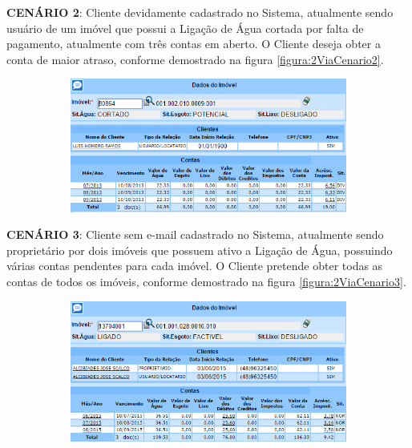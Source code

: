 \begin{flushleft}
	\begin{description}
		\item \textbf{CENÁRIO 2}: Cliente devidamente cadastrado no Sistema, atualmente sendo usuário de um imóvel que possui a Ligação de Água cortada por falta de pagamento, atualmente com três contas em aberto. O Cliente deseja obter a conta de maior atraso, conforme demostrado na figura \ref{figura:2ViaCenario2}.
		\begin{figure}[H]
			\centering
			\caption{Obter 2ª via - Cenário de Teste 2}
			\label{figura:2ViaCenario2}
			\begin{subfigure}[H]{\textwidth}
				\centering
				\includegraphics{figuras/cenarios/segunda_via/cenario_2.PNG}
			\end{subfigure}
		\end{figure}
	\end{description}
	
	\begin{description}
		\item \textbf{CENÁRIO 3}: Cliente sem e-mail cadastrado no Sistema, atualmente sendo proprietário por dois imóveis que possuem ativo a Ligação de Água, possuindo várias contas pendentes para cada imóvel. O Cliente pretende obter todas as contas de todos os imóveis, conforme demostrado na figura \ref{figura:2ViaCenario3}.
		\begin{figure}[H]
			\centering
			\caption{Obter 2ª via - Cenário de Teste 3}
			\label{figura:2ViaCenario3}
			\begin{subfigure}[H]{\textwidth}
				\centering
				\includegraphics{figuras/cenarios/segunda_via/cenario_3.PNG}
				\legend {\fontsize{10}{12}\selectfont {Fonte: Autoria Própria}.}	
			\end{subfigure}
		\end{figure}
	\end{description}
	

\end{flushleft}
